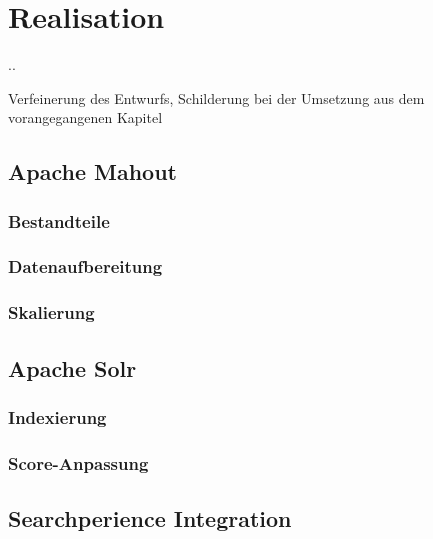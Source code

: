 \section{Realisation}\newpage.\newpage\newpage.\newpage
	
	Verfeinerung des Entwurfs, Schilderung bei der Umsetzung aus dem vorangegangenen Kapitel
	
\subsection{Apache Mahout}
\subsubsection{Bestandteile}
\subsubsection{Datenaufbereitung}
\subsubsection{Skalierung}
\subsection{Apache Solr}

\subsubsection{Indexierung}
\subsubsection{Score-Anpassung}






\subsection{Searchperience Integration}
